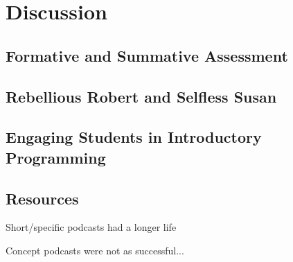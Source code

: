 
\chapter{Discussion} %
\label{cha:discussion}

\section{Formative and Summative Assessment} %
\label{sec:formative_and_summative_assessment}


\section{Rebellious Robert and Selfless Susan} %
\label{sec:rebellious_robert_and_selfless_susan}


\section{Engaging Students in Introductory Programming} %
\label{sec:engaging_students_in_introductory_programming}


\section{Resources} %
\label{sec:resources}

Short/specific podcasts had a longer life

Concept podcasts were not as successful... 


